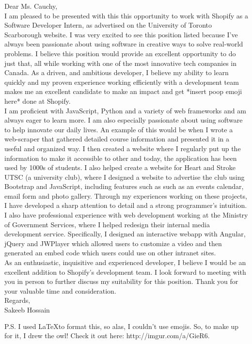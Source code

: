 \documentclass[]{deedy-resume-openfont}
\begin{document}
\begin{minipage}{0.80\textwidth}

Dear Ms. Cauchy,\\

I am pleased to be presented with this this opportunity to work with Shopify as a Software Developer Intern, as advertised on the University of Toronto Scarborough website. I was very excited to see this position listed because I’ve always been passionate about using software in creative ways to solve real-world problems. I believe this position would provide an excellent opportunity to do just that, all while working with one of the most innovative tech companies in Canada. As a driven, and ambitious developer, I believe my ability to learn quickly and my proven experience working efficiently with a development team makes me an excellent candidate to make an impact and get *insert poop emoji here* done at Shopify.\\

I am proficient with JavaScript, Python and a variety of web frameworks and am always eager to learn more. I am also especially passionate about using software to help innovate our daily lives. An example of this would be when I wrote a web-scraper that gathered detailed course information and presented it in a useful and organized way. I then created a website where I regularly put up the information to make it accessible to other and today, the application has been used by 1000s of students. I also helped create a website for Heart and Stroke UTSC (a university club), where I designed a website to advertise the club using Bootstrap and JavaScript, including features such as such as an events calendar, email form and photo gallery. Through my experiences working on these projects, I have developed a sharp attention to detail and a strong programmer’s intuition. \\

I also have professional experience with web development working at the Ministry of Government Services, where I helped redesign their internal media development service. Specifically, I designed an interactive webapp with Angular, jQuery and JWPlayer which allowed users to customize a video and then generated an embed code which users could use on other intranet sites. \\

As an enthusiastic, inquisitive and experienced developer, I believe I would be an excellent addition to Shopify’s development team. I look forward to meeting with you in person to further discuss my suitability for this position. Thank you for your valuable time and consideration. \\

Regards,\\
Sakeeb Hossain \\

\leavevmode \newline

P.S. I used \LaTeX \space to format this, so alas, I couldn't use emojis. So, to make up for it, I drew the owl! Check it out here: http://imgur.com/a/GieR6.

\end{minipage}
\end{document}
